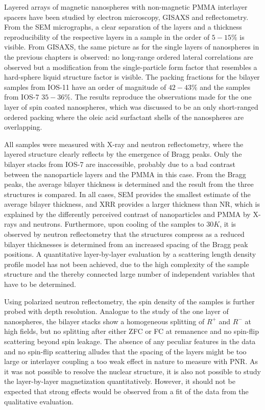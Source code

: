 \documentclass[\main/dresen_thesis.tex]{subfiles}
\begin{document}
  \label{sec:looselyPackedNS:bilayerStacks:summary}
  Layered arrays of magnetic nanospheres with non-magnetic PMMA interlayer spacers have been studied by electron microscopy, GISAXS and reflectometry.
  From the SEM micrographs, a clear separation of the layers and a thickness reproducibility of the respective layers in a sample in the order of $5 - 15 \%$ is visible.
  From GISAXS, the same picture as for the single layers of nanospheres in the previous chapters is observed: no long-range ordered lateral correlations are observed but a modification from the single-particle form factor that resembles a hard-sphere liquid structure factor is visible.
  The packing fractions for the bilayer samples from IOS-11 have an order of magnitude of $42 - 43 \%$ and the samples from IOS-7 $35 - 36 \%$.
  The results reproduce the observations made for the one layer of spin coated nanospheres, which was discussed to be an only short-ranged ordered packing where the oleic acid surfactant shells of the nanospheres are overlapping.

  All samples were measured with X-ray and neutron reflectometry, where the layered structure clearly reflects by the emergence of Bragg peaks.
  Only the bilayer stacks from IOS-7 are inaccessible, probably due to a bad contrast between the nanoparticle layers and the PMMA in this case.
  From the Bragg peaks, the average bilayer thickness is determined and the result from the three structures is compared.
  In all cases, SEM provides the smallest estimate of the average bilayer thickness, and XRR provides a larger thickness than NR, which is explained by the differently perceived contrast of nanoparticles and PMMA by X-rays and neutrons.
  Furthermore, upon cooling of the samples to $30 \unit{K}$, it is observed by neutron reflectometry that the structures compress as a reduced bilayer thicknesses is determined from an increased spacing of the Bragg peak positions.
  A quantitative layer-by-layer evaluation by a scattering length density profile model has not been achieved, due to the high complexity of the sample structure and the thereby connected large number of independent variables that have to be determined.

  Using polarized neutron reflectometry, the spin density of the samples is further probed with depth resolution.
  Analogue to the study of the one layer of nanospheres, the bilayer stacks show a homogeneous splitting of $R^{+}$ and $R^{-}$ at high fields, but no splitting after either ZFC or FC at remanence and no spin-flip scattering beyond spin leakage.
  The absence of any peculiar features in the data and no spin-flip scattering alludes that the spacing of the layers might be too large or interlayer coupling a too weak effect in nature to measure with PNR.
  As it was not possible to resolve the nuclear structure, it is also not possible to study the layer-by-layer magnetization quantitatively.
  However, it should not be expected that strong effects would be observed from a fit of the data from the qualitative evaluation.
\end{document}

